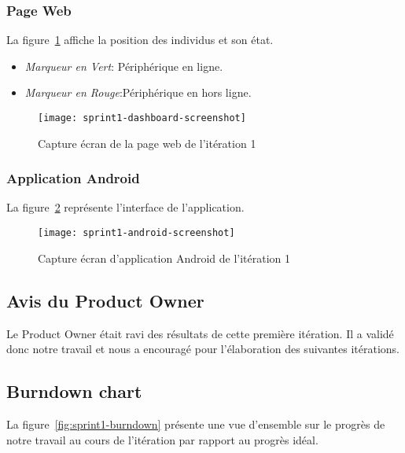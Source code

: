 \subsubsection{Page Web }

La figure~\ref{fig:sprint1-dashboard-screenshot} affiche la position des
individus et son état.

\begin{itemize}
    \item \textit{Marqueur en Vert}: Périphérique en ligne.
    \item \textit{Marqueur en Rouge}:Périphérique en hors ligne.
\end{itemize}

\begin{figure}[htbp]
    \centering
    \texttt{[image: sprint1-dashboard-screenshot]}
    \caption{Capture écran de la page web de l'itération 1}
\label{fig:sprint1-dashboard-screenshot}
\end{figure}

\subsubsection{Application Android}

La figure~\ref{fig:sprint1-android-screenshot} représente l'interface de
l'application.

\begin{figure}[htbp]
    \centering
    \texttt{[image: sprint1-android-screenshot]}
    \caption{Capture écran d'application Android de l'itération 1}
\label{fig:sprint1-android-screenshot}
\end{figure}

\subsection{Avis du Product Owner}

Le Product Owner était ravi des résultats de cette première itération. Il a
validé donc notre travail et nous a encouragé pour l'élaboration des suivantes
itérations.

\subsection{Burndown chart}

La figure~\ref{fig:sprint1-burndown} présente une vue d'ensemble sur le progrès
de notre travail au cours de l'itération par rapport au progrès idéal.

